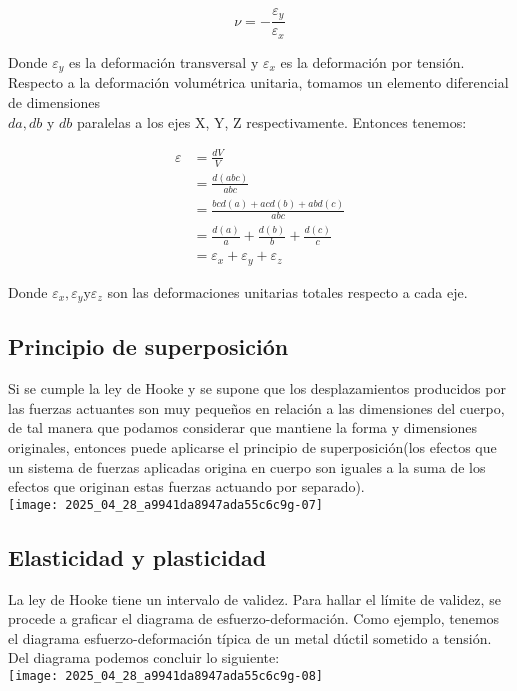 \begin{equation*}
\nu=-\frac{\varepsilon_{y}}{\varepsilon_{x}} \tag{4}
\end{equation*}


Donde $\varepsilon_{y}$ es la deformación transversal y $\varepsilon_{x}$ es la deformación por tensión. Respecto a la deformación volumétrica unitaria, tomamos un elemento diferencial de dimensiones\\
$d a, d b$ y $d b$ paralelas a los ejes X, Y, Z respectivamente. Entonces tenemos:

$$
\begin{aligned}
\varepsilon & =\frac{d V}{V} \\
& =\frac{d(a b c)}{a b c} \\
& =\frac{b c d(a)+a c d(b)+a b d(c)}{a b c} \\
& =\frac{d(a)}{a}+\frac{d(b)}{b}+\frac{d(c)}{c} \\
& =\varepsilon_{x}+\varepsilon_{y}+\varepsilon_{z}
\end{aligned}
$$

Donde $\varepsilon_{x}, \varepsilon_{y} \mathrm{y} \varepsilon_{z}$ son las deformaciones unitarias totales respecto a cada eje.

\subsection{ Principio de superposición}
Si se cumple la ley de Hooke y se supone que los desplazamientos producidos por las fuerzas actuantes son muy pequeños en relación a las dimensiones del cuerpo, de tal manera que podamos considerar que mantiene la forma y dimensiones originales, entonces puede aplicarse el principio de superposición(los efectos que un sistema de fuerzas aplicadas origina en cuerpo son iguales a la suma de los efectos que originan estas fuerzas actuando por separado).\\
\texttt{[image: 2025\_04\_28\_a9941da8947ada55c6c9g-07]}

\subsection{ Elasticidad y plasticidad}
La ley de Hooke tiene un intervalo de validez. Para hallar el límite de validez, se procede a graficar el diagrama de esfuerzo-deformación. Como ejemplo, tenemos el diagrama esfuerzo-deformación típica de un metal dúctil sometido a tensión.\\
Del diagrama podemos concluir lo siguiente:\\
\texttt{[image: 2025\_04\_28\_a9941da8947ada55c6c9g-08]}

